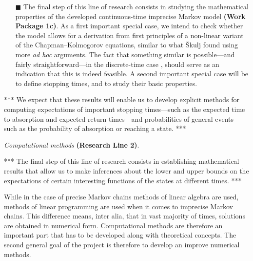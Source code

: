 \documentclass[11pt,dvipsnames,usenames,a4paper]{article}
\begin{document}
\begin{itemize}
\item[\tiny$\blacksquare$]
The final step of this line of research consists in studying the mathematical properties of the developed continuous-time imprecise Markov model {\bf(Work Package 1c)}.
As a first important special case, we intend to check whether the model allows for a derivation from first principles of a non-linear variant of the Chapman--Kolmogorov equations, similar to what \v{S}kulj \cite{skulj2015:continuous:bounds} found using more {\itshape ad hoc} arguments.
The fact that something similar is possible---and fairly straightforward---in the discrete-time case \cite{cooman2008}, should serve as an indication that this is indeed feasible. A second important special case will be to define stopping times, and to study their basic properties.\vspace{8pt}
\end{itemize}

*** We expect that these results will enable us to develop explicit methods for computing expectations of important stopping times---such as the expected time to absorption and expected return times---and probabilities of general events---such as the probability of absorption or reaching a state. ***

\vspace{8pt}


\emph{Computational methods} {\bf (Research Line 2)}.
\vspace{3pt}


*** The final step of this line of research consists in establishing mathematical results that allow us to make inferences about the lower and upper bounds on the expectations of certain interesting functions of the states at different times. ***

While in the case of precise Markov chains methods of linear algebra are used, methods of linear programming are used when it comes to imprecise Markov chains. 
This difference means, inter alia, that in vast majority of times, solutions are obtained in numerical form.
Computational methods are therefore an important part that has to be developed along with theoretical concepts. 
The second general goal of the project is therefore to develop an improve numerical methods. 
\end{document}
